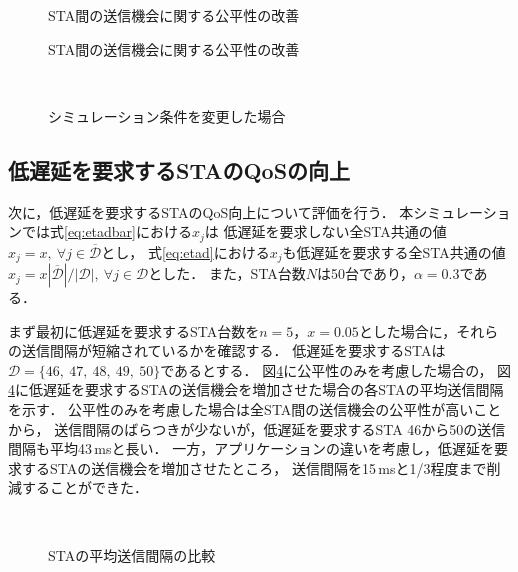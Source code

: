 \documentclass[technicalreport]{ieicej}
\begin{document}
	\begin{figure}[t]
		\centering
		\caption{STA間の送信機会に関する公平性の改善}
		\label{fig:fair}
	\end{figure}

	\begin{figure}[t]
		\centering
		\caption{STA間の送信機会に関する公平性の改善}
		\label{fig:thr_fair}
	\end{figure}

	\begin{figure}[t]
		\centering
		\\
		\caption{シミュレーション条件を変更した場合}
		\label{fig:chgparam}
	\end{figure}

	\subsection{低遅延を要求するSTAのQoSの向上}
	次に，低遅延を要求するSTAのQoS向上について評価を行う．
	本シミュレーションでは式\eqref{eq:etadbar}における$x_j$は
	低遅延を要求しない全STA共通の値$x_j=x,\ \forall j\in {\overline {\mathcal D}}$とし，
	式\eqref{eq:etad}における$x_j$も低遅延を要求する全STA共通の値$x_j=x|{\overline {\mathcal D}}|/|{\mathcal D}|,\ \forall j \in {\mathcal D}$とした．
	また，STA台数$N$は50台であり，$\alpha=0.3$である．
	\par
	まず最初に低遅延を要求するSTA台数を$n=5$，$x=0.05$とした場合に，それらの送信間隔が短縮されているかを確認する．
	低遅延を要求するSTAは${\mathcal D}=\{46,\ 47,\ 48,\ 49,\ 50\}$であるとする．
	図\ref{fig:inter}に公平性のみを考慮した場合の，
	図\ref{fig:inter}に低遅延を要求するSTAの送信機会を増加させた場合の各STAの平均送信間隔を示す．
	公平性のみを考慮した場合は全STA間の送信機会の公平性が高いことから，
	送信間隔のばらつきが少ないが，低遅延を要求するSTA 46から50の送信間隔も平均43\,msと長い．
	一方，アプリケーションの違いを考慮し，低遅延を要求するSTAの送信機会を増加させたところ，
	送信間隔を15\,msと1/3程度まで削減することができた．

	\begin{figure}[t]
		\centering
		\\
		\caption{STAの平均送信間隔の比較}
		\label{fig:inter}
	\end{figure}
\end{document}
